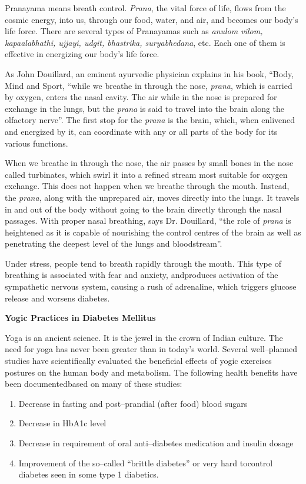 Pranayama means breath control. \textit{Prana}, the vital force of life, flows from the cosmic energy, into us, through our food, water, and air, and becomes our body’s life force. There are several types of Pranayamas such as \textit{anulom vilom, kapaalabhathi, ujjayi, udgit, bhastrika, suryabhedana}, etc. Each one of them is effective in energizing our body’s life force.

As John Douillard, an eminent ayurvedic physician explains in his book, “Body, Mind and Sport, “while we breathe in through the nose, \textit{prana}, which is carried by oxygen, enters the nasal cavity. The air while in the nose is prepared for exchange in the lungs, but the \textit{prana} is said to travel into the brain along the olfactory nerve”. The first stop for the \textit{prana} is the brain, which, when enlivened and energized by it, can coordinate with any or all parts of the body for its various functions.

When we breathe in through the nose, the air passes by small bones in the nose called turbinates, which swirl it into a refined stream most suitable for oxygen exchange. This does not happen when we breathe through the mouth. Instead, the \textit{prana}, along with the unprepared air, moves directly into the lungs. It travels in and out of the body without going to the brain directly through the nasal passages. With proper nasal breathing, says Dr. Douillard, “the role of \textit{prana} is heightened as it is capable of nourishing the control centres of the brain as well as penetrating the deepest level of the lungs and bloodstream”.

Under stress, people tend to breath rapidly through the mouth. This type of breathing is associated with fear and anxiety, and\break produces activation of the sympathetic nervous system, causing a rush of adrenaline, which triggers glucose release and worsens diabetes.

\noindent\textbf{Yogic Practices in Diabetes Mellitus}

Yoga is an ancient science. It is the jewel in the crown of Indian culture. The need for yoga has never been greater than in today’s world. Several well–planned studies have scientifically evaluated the beneficial effects of yogic exercises postures on the human body and metabolism. The following health benefits have been documented\break based on many of these studies:

\begin{enumerate}[•]
\itemsep=0pt
\item Decrease in fasting and post–prandial (after food) blood sugars
\item Decrease in HbA1c level
\item Decrease in requirement of oral anti–diabetes medication and insulin dosage
\item Improvement of the so–called “brittle diabetes” or very hard to\break control diabetes seen in some type 1 diabetics.
\end{enumerate}

